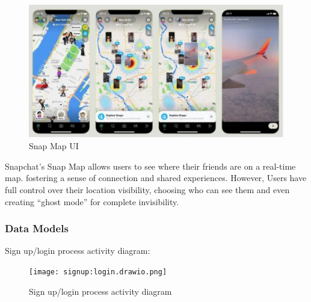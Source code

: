 \documentclass{article}
\begin{document}
\begin{figure}[h]
    \centering
    \includegraphics[width=0.5\linewidth]{snapMap.jpg}
    \caption{Snap Map UI}
    \label{fig:snap map}
\end{figure}

Snapchat’s Snap Map allows users to see where their friends are on a real-time map. fostering a sense of connection and shared experiences. However, Users have full control over their location visibility, choosing who can see them and even creating “ghost mode” for complete invisibility. \newline

\newpage
\subsubsection{Data Models}
Sign up/login process activity diagram:
\begin{figure}[h]
    \centering
    \texttt{[image: signup:login.drawio.png]}
    \caption{Sign up/login process activity diagram}
    \label{fig:activity diagram}
\end{figure}
\end{document}
